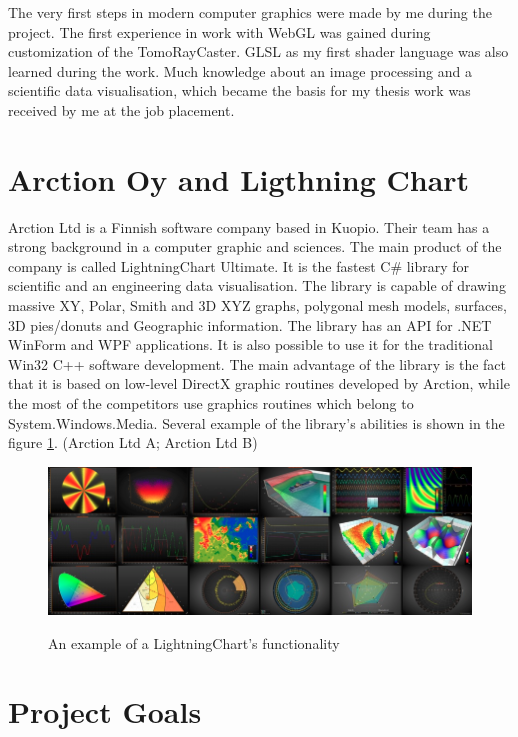 \documentclass[twoside, english, 11pt]{report}
\begin{document}
The very first steps in modern computer graphics were made by me during the project. The first experience in work with WebGL was gained during customization of the TomoRayCaster. GLSL as my first shader language was also learned during the work. Much knowledge about an image processing and a scientific data visualisation, which became the basis for my thesis work was received by me at the job placement.


\section{Arction Oy and Ligthning Chart}

Arction Ltd is a Finnish software company based in Kuopio. Their team has a strong background in a computer graphic and sciences. The main product of the company is called LightningChart Ultimate. It is the fastest C\# library for scientific and an engineering data visualisation. The library is capable of drawing massive XY, Polar, Smith and 3D XYZ graphs, polygonal mesh models, surfaces, 3D pies/donuts and Geographic information. The library has an API for .NET WinForm and WPF applications. It is also possible to use it for the traditional Win32 C++ software development. The main advantage of the library is the fact that it is based on low-level DirectX graphic routines developed by Arction, while the most of the competitors use graphics routines which belong to System.Windows.Media. Several example of the library's abilities is shown in the figure \ref{fig:lchu}. (Arction Ltd A; Arction Ltd B)\\
\begin{figure}[!h]
\includegraphics[scale=0.5]{img/lchu}\\
\caption{An example of a LightningChart's functionality\label{fig:lchu}}
\end{figure}


\section{Project Goals}
\end{document}
